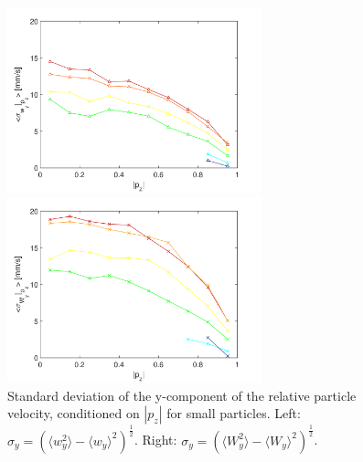 \documentclass[]{jfm}
\begin{document}
\begin{figure}
\centering
\begin{minipage}{.5\textwidth}
  \centering
  \includegraphics[width=2.9in]{figures/wy-local-sigma-small.pdf}
\end{minipage}%
\begin{minipage}{.5\textwidth}
  \centering
  \includegraphics[width=2.9in]{figures/wy-U-sigma-small.pdf}
\end{minipage}
\caption{Standard deviation of the y-component of the relative particle velocity, conditioned on $|p_z|$ for small particles. Left: $\sigma_y=(\langle w_y^2 \rangle-\langle w_y \rangle^2)^{\frac{1}{2}}$. Right: $\sigma_y=(\langle W_y^2 \rangle-\langle W_y \rangle^2)^{\frac{1}{2}}$.}
\label{Fig:wy-sigma}
\end{figure}
\end{document}
